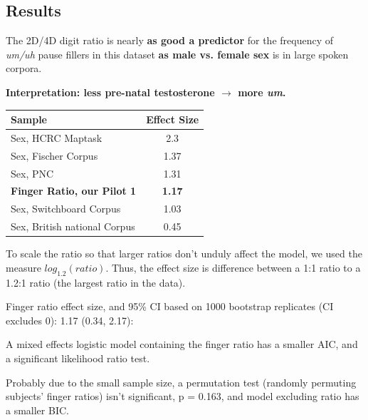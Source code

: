 \documentclass[a0,portrait]{a0poster}
\begin{document}
\begin{multicols}{2}

\section*{Results}



The 2D/4D digit ratio is nearly \textbf{as good a predictor} for the frequency of \textsl{um/uh} pause fillers in this dataset \textbf{as male vs. female sex} is in large spoken corpora.
\begin{center}
\noindent\textbf{Interpretation: less pre-natal testosterone $\rightarrow$ more \textsl{um}.}
\end{center}
\begin{table} %
\begin{tabular}{l c}
\toprule
\textbf{Sample} & \textbf{Effect Size}\\
\midrule
Sex, HCRC Maptask & 2.3\\
Sex, Fischer Corpus & 1.37\\
Sex, PNC & 1.31\\
\textbf{Finger Ratio, our Pilot 1} & \textbf{1.17}\\
Sex, Switchboard Corpus & 1.03\\
Sex, British national Corpus & 0.45\\
\bottomrule
\end{tabular}
\end{table}

To scale the ratio so that larger ratios don't unduly affect the model, we used the measure $log_1.2(ratio)$. Thus, the effect size is difference between a 1:1 ratio to a 1.2:1 ratio (the largest ratio in the data).

Finger ratio effect size, and 95\% CI based on 1000 bootstrap replicates (CI excludes 0): 1.17 (0.34, 2.17):

A mixed effects logistic model containing the finger ratio has a smaller AIC, and a significant likelihood ratio test.

Probably due to the small sample size, a permutation test (randomly permuting subjects' finger ratios) isn't significant, p = 0.163, and model excluding ratio has a smaller BIC.



\end{multicols}
\end{document}
